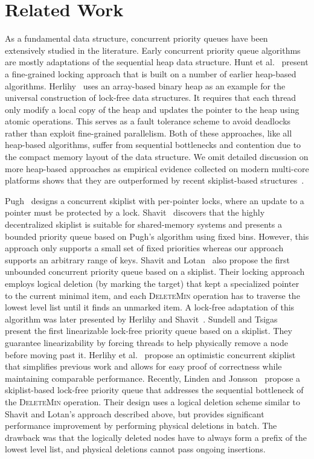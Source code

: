 \documentclass[10pt,journal,letter,compsoc]{IEEEtran}
\begin{document}
\section{Related Work}
\label{sec:related}
As a fundamental data structure, concurrent priority queues have been extensively studied in the literature.
Early concurrent priority queue algorithms are mostly adaptations of the sequential heap data structure.
Hunt et al.~\cite{hunt1996efficient} present a fine-grained locking approach that is built on a number of earlier heap-based algorithms.
Herlihy~\cite{herlihy1993methodology} uses an array-based binary heap as an example for the universal construction of lock-free data structures.
It requires that each thread only modify a local copy of the heap and updates the pointer to the heap using atomic operations.
This serves as a fault tolerance scheme to avoid deadlocks rather than exploit fine-grained parallelism.
Both of these approaches, like all heap-based algorithms, suffer from sequential bottlenecks and contention due to the compact memory layout of the data structure.
We omit detailed discussion on more heap-based approaches as empirical evidence collected on modern multi-core platforms shows that they are outperformed by recent skiplist-based structures~\cite{shavit2000skiplist,sundell2005fast}.

Pugh~\cite{pugh1990concurrent} designs a concurrent skiplist with per-pointer locks, where an update to a pointer must be protected by a lock. 
Shavit~\cite{shavit1999scalable} discovers that the highly decentralized skiplist is suitable for shared-memory systems and presents a bounded priority queue based on Pugh's algorithm using fixed bins. 
However, this approach only supports a small set of fixed priorities whereas our approach supports an arbitrary range of keys.
Shavit and Lotan~\cite{shavit2000skiplist} also propose the first unbounded concurrent priority queue based on a skiplist.
Their locking approach employs logical deletion (by marking the target) that kept a specialized pointer to the current minimal item, and each \textsc{DeleteMin} operation has to traverse the lowest level list until it finds an unmarked item.
A lock-free adaptation of this algorithm was later presented by Herlihy and Shavit~\cite{herlihy2012art}.
Sundell and Tsigas~\cite{sundell2005fast} present the first linearizable lock-free priority queue based on a skiplist.
They guarantee linearizability by forcing threads to help physically remove a node before moving past it.
Herlihy et al.~\cite{herlihy2006provably} propose an optimistic concurrent skiplist that simplifies previous work and allows for easy proof of correctness while maintaining comparable performance.
Recently, Linden and Jonsson~\cite{linden2013skiplist} propose a skiplist-based lock-free priority queue that addresses the sequential bottleneck of the \textsc{DeleteMin} operation.
Their design uses a logical deletion scheme similar to Shavit and Lotan's approach described above, but provides significant performance improvement by performing physical deletions in batch. 
The drawback was that the logically deleted nodes have to always form a prefix of the lowest level list, and physical deletions cannot pass ongoing insertions.
\end{document}
